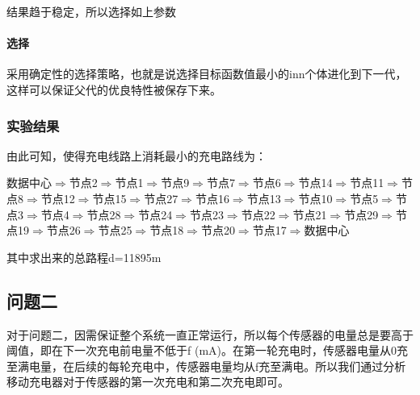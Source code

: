 \documentclass{article}
\begin{document}
结果趋于稳定，所以选择如上参数
\paragraph{选择}
采用确定性的选择策略，也就是说选择目标函数值最小的inn个体进化到下一代，这样可以保证父代的优良特性被保存下来。
\subsubsection{实验结果}
由此可知，使得充电线路上消耗最小的充电路线为：

\vspace{2ex}
\noindent 数据中心$\Rightarrow$节点2\;$\Rightarrow$节点1\;$\Rightarrow$节点9\;$\Rightarrow$节点7\;$\Rightarrow$节点6\;$\Rightarrow$节点14\;$\Rightarrow$节点11\;$\Rightarrow$节点8\;$\Rightarrow$节点12\;$\Rightarrow$节点15\;$\Rightarrow$节点27\;$\Rightarrow$节点16\;$\Rightarrow$节点13\;$\Rightarrow$节点10\;$\Rightarrow$节点5\;$\Rightarrow$节点3\;$\Rightarrow$节点4\;$\Rightarrow$节点28\;$\Rightarrow$节点24\;$\Rightarrow$节点23\;$\Rightarrow$节点22\;$\Rightarrow$节点21$\Rightarrow$节点29\;$\Rightarrow$节点19\;$\Rightarrow$节点26\;$\Rightarrow$节点25\;$\Rightarrow$节点18\;$\Rightarrow$节点20\;$\Rightarrow$节点17\;$\Rightarrow$数据中心
\vspace{2ex}

其中求出来的总路程d=11895m

\subsection{问题二}
对于问题二，因需保证整个系统一直正常运行，所以每个传感器的电量总是要高于阈值，即在下一次充电前电量不低于f (mA)。在第一轮充电时，传感器电量从0充至满电量，在后续的每轮充电中，传感器电量均从f充至满电。所以我们通过分析移动充电器对于传感器的第一次充电和第二次充电即可。
\end{document}
